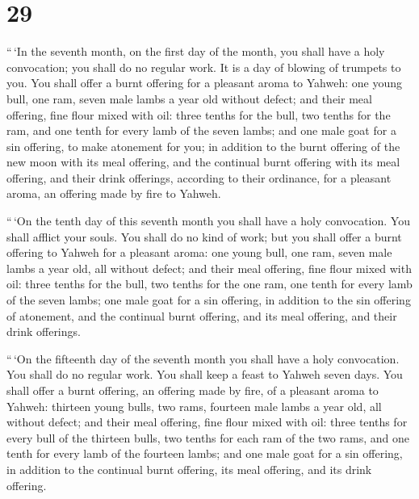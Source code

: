 \hypertarget{section-28}{%
\section{29}\label{section-28}}

 ``\,`In the seventh month, on the first day of the month,
you shall have a holy convocation; you shall do no regular work. It is a
day of blowing of trumpets to you.  You shall offer a burnt
offering for a pleasant aroma to Yahweh: one young bull, one ram, seven
male lambs a year old without defect;  and their meal
offering, fine flour mixed with oil: three tenths for the bull, two
tenths for the ram,  and one tenth for every lamb of the
seven lambs;  and one male goat for a sin offering, to make
atonement for you;  in addition to the burnt offering of the
new moon with its meal offering, and the continual burnt offering with
its meal offering, and their drink offerings, according to their
ordinance, for a pleasant aroma, an offering made by fire to Yahweh.

 ``\,`On the tenth day of this seventh month you shall have
a holy convocation. You shall afflict your souls. You shall do no kind
of work;  but you shall offer a burnt offering to Yahweh for
a pleasant aroma: one young bull, one ram, seven male lambs a year old,
all without defect;  and their meal offering, fine flour
mixed with oil: three tenths for the bull, two tenths for the one ram,
 one tenth for every lamb of the seven lambs; 
one male goat for a sin offering, in addition to the sin offering of
atonement, and the continual burnt offering, and its meal offering, and
their drink offerings.

 ``\,`On the fifteenth day of the seventh month you shall
have a holy convocation. You shall do no regular work. You shall keep a
feast to Yahweh seven days.  You shall offer a burnt
offering, an offering made by fire, of a pleasant aroma to Yahweh:
thirteen young bulls, two rams, fourteen male lambs a year old, all
without defect;  and their meal offering, fine flour mixed
with oil: three tenths for every bull of the thirteen bulls, two tenths
for each ram of the two rams,  and one tenth for every lamb
of the fourteen lambs;  and one male goat for a sin
offering, in addition to the continual burnt offering, its meal
offering, and its drink offering.

